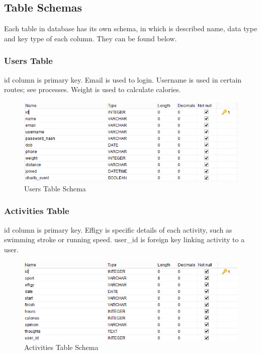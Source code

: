 \documentclass{article}[12pt,a4paper]
\begin{document}
\clearpage

\subsection{Table Schemas}
Each table in database has its own schema, in which is described name, data type and key type of each column. They can be found below.

\subsubsection{Users Table}
id column is primary key. Email is used to login. Username is used in certain routes; see processes. Weight is used to calculate calories.
\begin{figure}[h!]
  \includegraphics[scale=0.65]{images/database/users_schema}
  \caption{Users Table Schema}
\end{figure}

\subsubsection{Activities Table}
id column is primary key. Effigy is specific details of each activity, such as swimming stroke or running speed. user\_id is foreign key linking activity to a user.
\begin{figure}[h!]
  \includegraphics[scale=0.65]{images/database/activities_schema}
  \caption{Activities Table Schema}
\end{figure}
\end{document}
